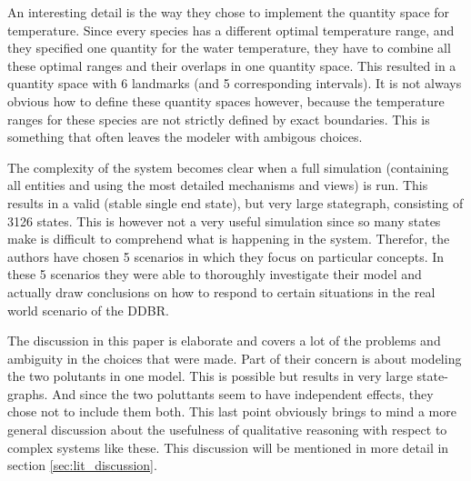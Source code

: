 \documentclass{article} %
\begin{document}
An interesting detail is the way they chose to implement the quantity space for
temperature. Since every species has a different optimal temperature range, and
they specified one quantity for the water temperature, they have to combine all
these optimal ranges and their overlaps in one quantity space. This resulted in
a quantity space with 6 landmarks (and 5 corresponding intervals). It is not
always obvious how to define these quantity spaces however, because the
temperature ranges for these species are not strictly defined by exact
boundaries. This is something that often leaves the modeler with ambigous
choices.

\vspace{0.8 em}

The complexity of the system becomes clear when a full simulation (containing all
entities and using the most detailed mechanisms and views) is run. This results
in a valid (stable single end state), but very large stategraph, consisting of
3126 states. This is however not a very useful simulation since so many states
make is difficult to comprehend what is happening in the system. Therefor, the
authors have chosen 5 scenarios in which they focus on particular concepts. In
these 5 scenarios they were able to thoroughly investigate their model and
actually draw conclusions on how to respond to certain situations in the real 
world scenario of the DDBR.

\vspace{0.8em}

The discussion in this paper is elaborate and covers a lot of the problems and
ambiguity in the choices that were made. Part of their concern is about modeling
the two polutants in one model. This is possible but results in very large
state-graphs. And since the two poluttants seem to have independent effects,
they chose not to include them both.
This last point obviously brings to mind a more general discussion about the
usefulness of qualitative reasoning with respect to complex systems like these.
This discussion will be mentioned in more detail in section
\ref{sec:lit_discussion}.

\end{document}
